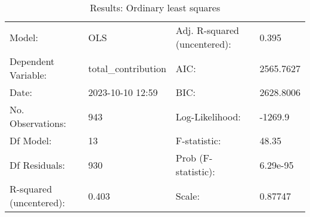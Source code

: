 \begin{table}
\caption{Results: Ordinary least squares}
\label{}
\begin{center}
\begin{tabular}{llll}
\hline
Model:                  & OLS                 & Adj. R-squared (uncentered): & 0.395      \\
Dependent Variable:     & total\_contribution & AIC:                         & 2565.7627  \\
Date:                   & 2023-10-10 12:59    & BIC:                         & 2628.8006  \\
No. Observations:       & 943                 & Log-Likelihood:              & -1269.9    \\
Df Model:               & 13                  & F-statistic:                 & 48.35      \\
Df Residuals:           & 930                 & Prob (F-statistic):          & 6.29e-95   \\
R-squared (uncentered): & 0.403               & Scale:                       & 0.87747    \\
\hline
\end{tabular}
\end{center}


\end{table}
